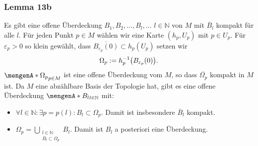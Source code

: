 \subsubsection{Lemma 13b} %
\label{ssub:313}
Es gibt eine offene Überdeckung $B_1, B_2, \ldots , B_l , \ldots $ $l \in \mathds{N}$ von $M$ mit $\overline{B}_l$ kompakt für alle $l$.
Für jeden Punkt $p \in M$ wählen wir eine Karte $(h_p,U_p)$ mit $p \in U_p$. Für $\varepsilon_p >0$ so klein gewählt, dass 
\(
	\overline{B_{\varepsilon_p}(0)} \subset h_p(U_p)
\)
setzen wir 
\[
	\Omega_p := h_p ^{-1} \enbrace*{B_{\varepsilon_p}(0)}.
\]
$\set{\Omega_p}_{p \in M}$ ist eine offene Überdeckung vom $M$, so dass $\overline{\Omega_p}$ kompakt in $M$ ist. Da $M$ eine abzählbare Basis der Topologie hat, gibt es 
eine offene Überdeckung $\set{B_l}_{l \in \mathds{N}}$ mit:
\begin{itemize}
	\item $\forall l \in \mathds{N} : \exists p=p(l) : B_l \subset \Omega_p$. Damit ist insbesondere $\overline{B}_l$ kompakt.
	\item $\Omega_p = \bigcup_{\substack{l \in \mathds{N} \\ B_l \subset \Omega_p}} B_l$. Damit ist $B_l$ a posteriori eine Überdeckung. \bewende
\end{itemize}

